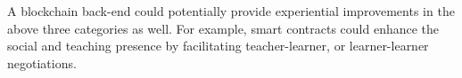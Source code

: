 A blockchain back-end could potentially provide experiential improvements in the above three categories as well. 
For example, smart contracts could enhance the social and teaching presence by facilitating teacher-learner, or 
learner-learner negotiations.





